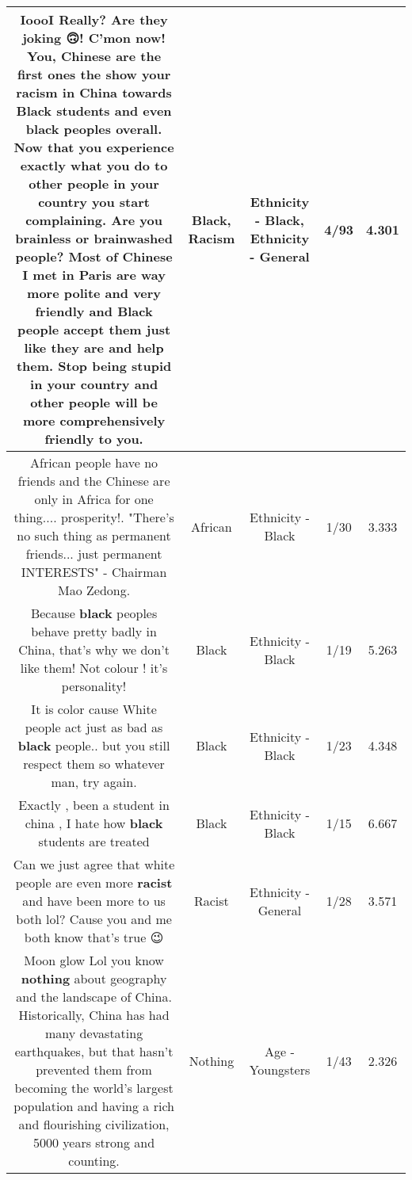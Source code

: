 \documentclass[11pt]{article}
\newlength\mylength
\begin{document}
\begin{center}
\begin{longtable}{|C{.65\mylength}|C{.30\mylength}|C{.12\mylength}|C{.12\mylength}|C{.12\mylength}|}
  \small IoooI Really? Are they joking 🙃! C'mon now! You, Chinese are the first ones the show your \textbf{racism} in China towards \textbf{Black} students and even \textbf{black} peoples overall. Now that you experience exactly what you do to other people in your country you start complaining. Are you brainless or brainwashed people? Most of Chinese I met in Paris are way more polite and very friendly and \textbf{Black} people accept them just like they are and help them. Stop being stupid in your country and other people will be more comprehensively friendly to you.\normalsize   & Black, Racism & Ethnicity - Black, Ethnicity - General & 4/93 & 4.301 \\  \hline
  \small African people have no friends and the Chinese are only in Africa for one thing.... prosperity!. "There's no such thing as permanent friends... just permanent INTERESTS" - Chairman Mao Zedong.\normalsize   & African & Ethnicity - Black & 1/30 & 3.333 \\  \hline
  \small Because \textbf{black} peoples behave pretty badly in China, that's why we don't like them! Not colour ! it's personality!\normalsize   & Black & Ethnicity - Black & 1/19 & 5.263 \\  \hline
  \small It is color cause White people act just as bad as \textbf{black} people.. but you still respect them so whatever man, try again.\normalsize   & Black & Ethnicity - Black & 1/23 & 4.348 \\  \hline
  \small Exactly  , been a student in china , I hate how \textbf{black} students are treated\normalsize   & Black & Ethnicity - Black & 1/15 & 6.667 \\  \hline
  \small Can we just agree that white people are even more \textbf{racist} and have been more to us both lol? Cause you and me both know that's true 😉\normalsize   & Racist & Ethnicity - General & 1/28 & 3.571 \\  \hline
  \small Moon glow Lol you know \textbf{nothing} about geography and the landscape of China. Historically, China has had many devastating earthquakes, but that hasn't prevented them from becoming the world's largest population and having a rich and flourishing civilization, 5000 years strong and counting.\normalsize   & Nothing & Age - Youngsters & 1/43 & 2.326 \\  \hline

\end{longtable}
\end{center}
\end{document}
